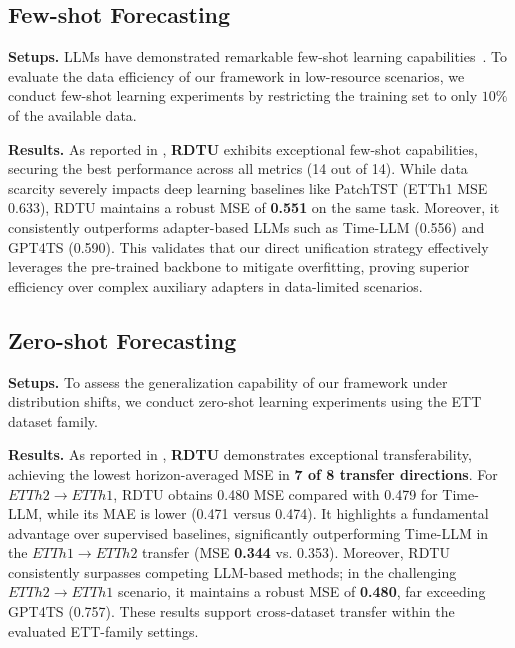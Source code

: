 \subsection{Few-shot Forecasting}

\noindent\textbf{Setups.} LLMs have demonstrated remarkable few-shot learning capabilities~\citep{liu2023large}. To evaluate the data efficiency of our framework in low-resource scenarios, we conduct few-shot learning experiments by restricting the training set to only $10\%$ of the available data.

\noindent\textbf{Results.} As reported in , \textbf{RDTU} exhibits exceptional few-shot capabilities, securing the best performance across all metrics (14 out of 14). While data scarcity severely impacts deep learning baselines like PatchTST (ETTh1 MSE 0.633), RDTU maintains a robust MSE of \textbf{0.551} on the same task. Moreover, it consistently outperforms adapter-based LLMs such as Time-LLM (0.556) and GPT4TS (0.590). This validates that our direct unification strategy effectively leverages the pre-trained backbone to mitigate overfitting, proving superior efficiency over complex auxiliary adapters in data-limited scenarios.

\subsection{Zero-shot Forecasting}

\noindent\textbf{Setups.} To assess the generalization capability of our framework under distribution shifts, we conduct zero-shot learning experiments using the ETT dataset family.

\noindent\textbf{Results.} As reported in , \textbf{RDTU} demonstrates exceptional transferability, achieving the lowest horizon-averaged MSE in \textbf{7 of 8 transfer directions}. For $ETTh2 \to ETTh1$, RDTU obtains 0.480 MSE compared with 0.479 for Time-LLM, while its MAE is lower (0.471 versus 0.474). It highlights a fundamental advantage over supervised baselines, significantly outperforming Time-LLM in the $ETTh1 \to ETTh2$ transfer (MSE \textbf{0.344} vs. 0.353). Moreover, RDTU consistently surpasses competing LLM-based methods; in the challenging $ETTh2 \to ETTh1$ scenario, it maintains a robust MSE of \textbf{0.480}, far exceeding GPT4TS (0.757). These results support cross-dataset transfer within the evaluated ETT-family settings.

